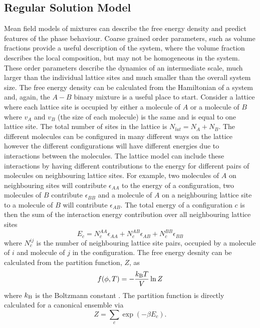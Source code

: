 \subsection{Regular Solution Model}
Mean field models of mixtures can describe the free energy density and predict features of the phase behaviour. Coarse grained order parameters, such as volume fractions provide a useful description of the system, where the volume fraction describes the local  composition, but may not be homogeneous in the system. These order parameters describe the dynamics of an intermediate scale, much larger than the individual lattice sites and much smaller than the overall system size.
The free energy density can be calculated from the Hamiltonian of a system and, again, the $A-B$ binary mixture is a useful place to start. Consider a lattice where each lattice site is occupied by either a molecule of $A$ or a molecule of $B$ where $v_A$ and $v_B$ (the size of each molecule) is the same and is equal to one lattice site. The total number of sites in the lattice  is $N_{lat} = N_A + N_B$. The different molecules can be configured in many different ways on the lattice however the different configurations will have different energies due to interactions between the molecules. The lattice model can include these interactions by having different contributions to the energy for different pairs of molecules on neighbouring lattice sites. For example, two molecules of $A$ on neighbouring sites will contribute $\epsilon_{AA}$ to the energy of a configuration, two molecules of $B$ contribute $\epsilon_{BB}$ and a molecule of $A$ on a neighbouring lattice site to a molecule of $B$ will contribute $\epsilon_{AB}$. The total energy of a configuration $c$ is then the sum of the interaction energy contribution over all neighbouring lattice sites
\begin{equation}
    E_{c} = N_c^{AA}\epsilon_{AA} + N_c^{AB}\epsilon_{AB} + N_c^{BB}\epsilon_{BB}
\end{equation}
where $N_c^{ij}$ is the number of neighbouring lattice site pairs, occupied by a molecule of $i$ and molecule of $j$ in the configuration. The free energy desnity can be calculated from the partition function, $Z$, as
\begin{equation}
    f(\phi, T) = -\frac{k_{\rm B} T}{V}\ln Z
    \label{eq:f_ln}
\end{equation}
where $k_{\rm B}$ is the Boltzmann constant \cite{kardar2007statistical}. The partition function is directly calculated for a canonical ensemble via
\begin{equation}
    Z = \sum_c \exp{(-\beta E_c)}.
\end{equation}
